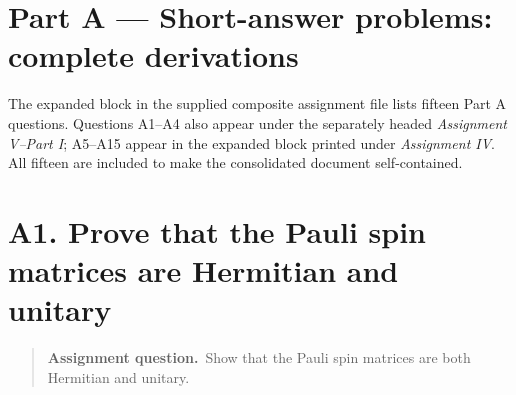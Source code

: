 \documentclass[11pt,a4paper]{article}
\theoremstyle{definition}
\newenvironment{question}{\begin{quote}\small\noindent\textbf{Assignment question.}\ }{\end{quote}}
\begin{document}
\section*{Part A --- Short-answer problems: complete derivations}
\noindent The expanded block in the supplied composite assignment file lists fifteen Part A questions. Questions A1--A4 also appear under the separately headed \emph{Assignment V--Part I}; A5--A15 appear in the expanded block printed under \emph{Assignment IV}. All fifteen are included to make the consolidated document self-contained.

\section{A1. Prove that the Pauli spin matrices are Hermitian and unitary}
\begin{question}Show that the Pauli spin matrices are both Hermitian and unitary.\end{question}
\end{document}
